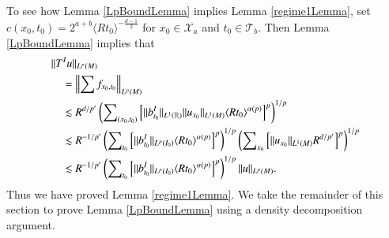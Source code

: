 To see how Lemma \ref{LpBoundLemma} implies Lemma \ref{regime1Lemma}, set $c(x_0,t_0) = 2^{a+b} \langle R t_0 \rangle^{- \frac{d-1}{2}}$ for $x_0 \in \mathcal{X}_{a}$ and $t_0 \in \mathcal{T}_{b}$. Then Lemma \ref{LpBoundLemma} implies that
%
\begin{equation}
\begin{split}
    &\| T^I u \|_{L^p(M)}\\
    &\quad = \left\| \sum f_{x_0,t_0} \right\|_{L^p(M)}\\
    &\quad \lesssim R^{d/p'} \left( \sum\nolimits_{(x_0,t_0)} \left[ \| b_{t_0}^I \|_{L^1(\operatorname{\mathbb{R}})} \| u_{x_0} \|_{L^1(M)} \langle R t_0 \rangle^{\alpha(p)} \right]^p \right)^{1/p}\\
    &\quad \lesssim R^{-1/p'} \left( \sum\nolimits_{t_0} \Big[ \| b_{t_0}^I \|_{L^p(I_0)} \langle R t_0 \rangle^{\alpha(p)} \Big]^p \right)^{1/p}\left( \sum\nolimits_{x_0} \left[ \| u_{x_0} \|_{L^1(M)}  R^{d/p'} \right]^p \right)^{1/p}\\
    &\quad \lesssim R^{-1/p'} \left( \sum\nolimits_{t_0} \Big[ \| b_{t_0}^I \|_{L^p(I_0)} \langle R t_0 \rangle^{\alpha(p)} \Big]^p \right)^{1/p} \| u \|_{L^p(M)}.
\end{split}
\end{equation}
%
Thus we have proved Lemma \ref{regime1Lemma}. We take the remainder of this section to prove Lemma \ref{LpBoundLemma} using a density decomposition argument.

